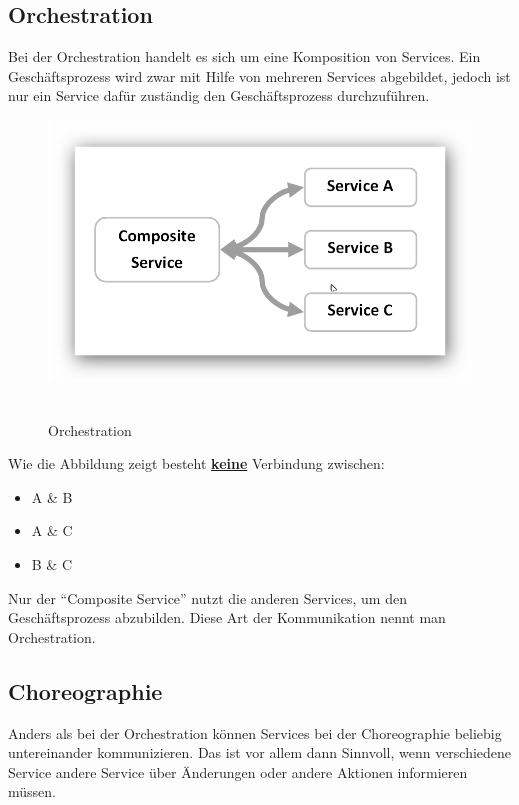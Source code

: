 \subsection{Orchestration}
\label{subsec:orchestration}
Bei der Orchestration handelt es sich um eine Komposition von Services. Ein Geschäftsprozess wird zwar mit Hilfe von mehreren Services abgebildet, jedoch ist nur ein Service dafür zuständig den Geschäftsprozess durchzuführen.
\newpage
\begin{figure}[htb]
    \centering 
    \includegraphics[width=\linewidth]{content/images/ServiceOrchestration}\
    \caption[Orchestration]{Orchestration}
    \label{fig:ServiceOrchestration}  
\end{figure}
\noindent
Wie die Abbildung zeigt besteht \textbf{\underline{keine}} Verbindung zwischen:
\begin{itemize}
    \item A \& B
    \item A \& C
    \item B \& C
\end{itemize}
Nur der "`Composite Service"' nutzt die anderen Services, um den Geschäftsprozess abzubilden. Diese Art der Kommunikation nennt man Orchestration.

\subsection{Choreographie}
\label{subsec:choreographie}
Anders als bei der Orchestration können Services bei der Choreographie beliebig untereinander kommunizieren. Das ist vor allem dann Sinnvoll, wenn verschiedene Service andere Service über Änderungen oder andere Aktionen informieren müssen.

